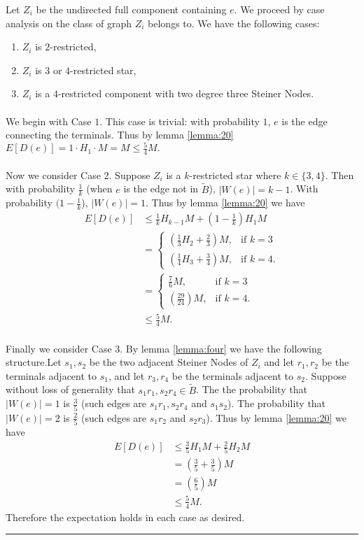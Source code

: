 \documentclass[letterpaper,12pt,oneside,onecolumn]{article}
\newenvironment{proof}{{\bf Proof:  }}{\hfill\rule{2mm}{2mm}}
\begin{document}
\begin{proof}
Let $Z_i$ be the undirected full component containing $e$. We proceed by case analysis on the class of graph $Z_i$ belongs to. We have the following cases:
\begin{enumerate}
\item $Z_i$ is $2$-restricted,
\item $Z_i$ is $3$ or $4$-restricted star,
\item $Z_i$ is a $4$-restricted component with two degree three Steiner Nodes.
\end{enumerate}
\paragraph{}
We begin with Case $1$. This case is trivial: with probability $1$, $e$ is the edge connecting the terminals. Thus by lemma \ref{lemma:20} $E[D(e)] = 1\cdot H_1 \cdot M = M \leq \frac{5}{4} M.$
\paragraph{}
Now we consider Case $2$. Suppose $Z_i$ is a $k$-restricted star where $k \in \{3,4\}$. Then with probability $\frac{1}{k}$ (when $e$ is the edge not in $\tilde{B}$), $|W(e)| = k-1$. With probability $(1-\frac{1}{k}$), $|W(e)| = 1$. Thus by lemma \ref{lemma:20} we have
\begin{align*}E[D(e)] &\leq \frac{1}{k} H_{k-1} M + (1-\frac{1}{k})H_1 M
\\&=\begin{cases}
(\frac{1}{3}H_2 + \frac{2}{3})M, &\text{if $k = 3$} \\
(\frac{1}{4}H_3 + \frac{3}{4})M, &\text{if $k=4$}.
\end{cases} \\
&=\begin{cases}
\frac{7}{6}M, &\text{if $k = 3$} \\
(\frac{29}{24})M, &\text{if $k=4$}.
\end{cases} \\
&\leq \frac{5}{4} M.
\end{align*}
\paragraph{}
Finally we consider Case $3$. By lemma \ref{lemma:four} we have the following structure.Let $s_1,s_2$ be the two adjacent Steiner Nodes of $Z_i$ and let $r_1,r_2$ be the terminals adjacent to $s_1$, and let $r_3,r_4$ be the terminals adjacent to $s_2$. Suppose without loss of generality that $s_1r_1, s_2r_4 \in \tilde{B}$. The the probability that $|W(e)| = 1$ is $\frac{3}{5}$ (such edges are $s_1r_1, s_2r_4$ and $s_1s_2$). The probability that $|W(e)| = 2$ is $\frac{2}{5}$ (such edges are $s_1r_2$ and $s_2r_3$). Thus by lemma \ref{lemma:20} we have
\begin{align*}
E[D(e)] &\leq \frac{3}{5}H_1M + \frac{2}{5}H_2M \\
&= (\frac{3}{5} + \frac{3}{5}) M \\
&= (\frac{6}{5})M \\
&\leq \frac{5}{4}M.
\end{align*} 
Therefore the expectation holds in each case as desired.
\end{proof}
\end{document}
